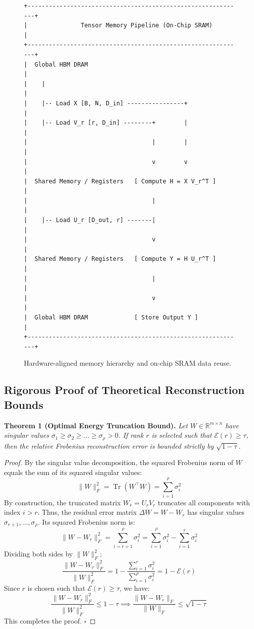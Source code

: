 {\begin{figure}[H]
\centering
\begin{verbatim}
+-------------------------------------------------------------+
|               Tensor Memory Pipeline (On-Chip SRAM)         |
+-------------------------------------------------------------+
|  Global HBM DRAM                                            |
|    |                                                        |
|    |-- Load X [B, N, D_in] ----------------+                |
|    |-- Load V_r [r, D_in] --------+        |                |
|                                   |        |                |
|                                   v        v                |
|  Shared Memory / Registers   [ Compute H = X V_r^T ]        |
|                                   |                         |
|    |-- Load U_r [D_out, r] -------|                         |
|                                   v                         |
|  Shared Memory / Registers   [ Compute Y = H U_r^T ]        |
|                                   |                         |
|                                   v                         |
|  Global HBM DRAM             [ Store Output Y ]             |
+-------------------------------------------------------------+
\end{verbatim}
\caption{Hardware-aligned memory hierarchy and on-chip SRAM data reuse.}
\label{fig:memory_hierarchy}
\end{figure}

\subsection{Rigorous Proof of Theoretical Reconstruction Bounds}

\textbf{Theorem 1 (Optimal Energy Truncation Bound).} \textit{Let $W \in \mathbb{R}^{m \times n}$ have singular values $\sigma_1 \ge \sigma_2 \ge \dots \ge \sigma_{\rho} > 0$. If rank $r$ is selected such that $\mathcal{E}(r) \ge \tau$, then the relative Frobenius reconstruction error is bounded strictly by $\sqrt{1 - \tau}$.}

\begin{proof}
By the singular value decomposition, the squared Frobenius norm of $W$ equals the sum of its squared singular values:
\[
\|W\|_F^2 = \operatorname{Tr}(W^\top W) = \sum_{i=1}^{\rho} \sigma_i^2
\]
By construction, the truncated matrix $W_r = U_r V_r$ truncates all components with index $i > r$. Thus, the residual error matrix $\Delta W = W - W_r$ has singular values $\sigma_{r+1}, \dots, \sigma_{\rho}$.
Its squared Frobenius norm is:
\[
\|W - W_r\|_F^2 = \sum_{i=r+1}^{\rho} \sigma_i^2 = \sum_{i=1}^{\rho} \sigma_i^2 - \sum_{i=1}^{r} \sigma_i^2
\]
Dividing both sides by $\|W\|_F^2$:
\[
\frac{\|W - W_r\|_F^2}{\|W\|_F^2} = 1 - \frac{\sum_{i=1}^{r} \sigma_i^2}{\sum_{i=1}^{\rho} \sigma_i^2} = 1 - \mathcal{E}(r)
\]
Since $r$ is chosen such that $\mathcal{E}(r) \ge \tau$, we have:
\[
\frac{\|W - W_r\|_F^2}{\|W\|_F^2} \le 1 - \tau \implies \frac{\|W - W_r\|_F}{\|W\|_F} \le \sqrt{1 - \tau}
\]
This completes the proof. $\square$
\end{proof}

}
